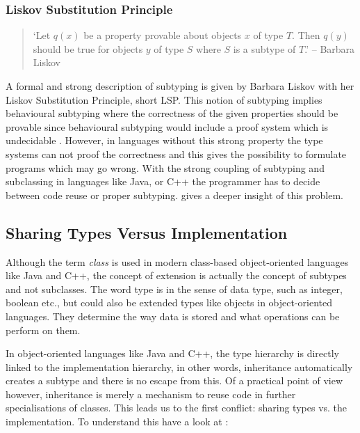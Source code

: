 \subsubsection{Liskov Substitution Principle}
\begin{quotation}
`Let $q(x)$ be a property provable about objects $x$ of type $T$. Then
$q(y)$ should be true for objects $y$ of type $S$ where $S$ is a subtype
of $T$.' -- Barbara Liskov \cite{liskov_behavioral_1999}
\end{quotation}

A formal and strong description of subtyping is given by Barbara
Liskov with her Liskov Substitution Principle, short LSP. This notion
of subtyping implies behavioural subtyping where the correctness
of the given properties should be provable since behavioural
subtyping would include a proof system which is undecidable
\cite{poll_behavioural_1998}. However, in languages without this strong
property the type systems can not proof the correctness and this gives
the possibility to formulate programs which may go wrong. 
With the
strong coupling of subtyping and subclassing in languages like Java,
\cs or C++ the programmer has to decide between code reuse or proper
subtyping.  gives a deeper insight of this
problem.

\subsection{Sharing Types Versus Implementation}
\label{sec:sharingTypes}

Although the term \emph{class} is used in modern class-based object-oriented
languages like Java and C++, the concept of extension is actually the
concept of subtypes and not subclasses. The word type is in the sense of data type, such
as integer, boolean etc., but could also be extended types like objects
in object-oriented languages. They determine the way data is stored and
what operations can be perform on them.

In object-oriented languages like Java and C++, the type hierarchy
is directly linked to the implementation hierarchy, in other words,
inheritance automatically creates a subtype and there is no escape
from this. Of a practical point of view however, inheritance is merely
a mechanism to reuse code in further specialisations of classes. This
leads us to the first conflict: sharing types vs. the implementation. To
understand this have a look at 
\cite{simons_theory_2003-4}:

